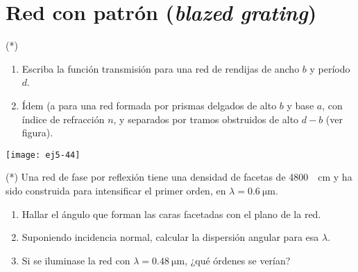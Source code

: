 \section*{Red con patrón (\emph{blazed grating})}

\item (*)
\begin{minipage}[t][1.7cm]{0.85\textwidth}
\begin{enumerate}
	\item Escriba la función transmisión para una red de rendijas de ancho $b$ y período $d$.
	\item Ídem (a para una red formada por prismas delgados de alto $b$ y base $a$, con índice de refracción $n$, y separados por tramos obstruidos de alto $d-b$ (ver figura). 
\end{enumerate}
\end{minipage}
\begin{minipage}[c][2cm][t]{0.1\textwidth}
	\texttt{[image: ej5-44]}
\end{minipage}



\item (*) Una red de fase por reflexión tiene una densidad de facetas de \SI{4800}{\per\centi\metre} y ha sido construida para intensificar el primer orden, en $\lambda = \SI{0.6}{\micro\metre}$.
\begin{enumerate}
	\item Hallar el ángulo que forman las caras facetadas con el plano de la red. 
	\item Suponiendo incidencia normal, calcular la dispersión angular para esa $\lambda$. 
	\item Si se iluminase la red con $\lambda = \SI{0.48}{\micro\metre}$, ¿qué órdenes se verían?
\end{enumerate}





